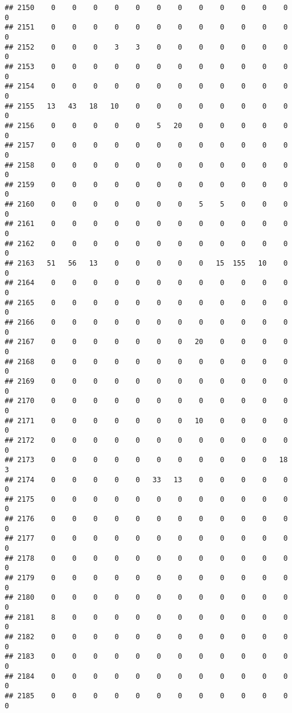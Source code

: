 \documentclass[]{article}
\begin{document}
\begin{verbatim}
## 2150    0    0    0    0    0    0    0    0    0    0    0    0    0
## 2151    0    0    0    0    0    0    0    0    0    0    0    0    0
## 2152    0    0    0    3    3    0    0    0    0    0    0    0    0
## 2153    0    0    0    0    0    0    0    0    0    0    0    0    0
## 2154    0    0    0    0    0    0    0    0    0    0    0    0    0
## 2155   13   43   18   10    0    0    0    0    0    0    0    0    0
## 2156    0    0    0    0    0    5   20    0    0    0    0    0    0
## 2157    0    0    0    0    0    0    0    0    0    0    0    0    0
## 2158    0    0    0    0    0    0    0    0    0    0    0    0    0
## 2159    0    0    0    0    0    0    0    0    0    0    0    0    0
## 2160    0    0    0    0    0    0    0    5    5    0    0    0    0
## 2161    0    0    0    0    0    0    0    0    0    0    0    0    0
## 2162    0    0    0    0    0    0    0    0    0    0    0    0    0
## 2163   51   56   13    0    0    0    0    0   15  155   10    0    0
## 2164    0    0    0    0    0    0    0    0    0    0    0    0    0
## 2165    0    0    0    0    0    0    0    0    0    0    0    0    0
## 2166    0    0    0    0    0    0    0    0    0    0    0    0    0
## 2167    0    0    0    0    0    0    0   20    0    0    0    0    0
## 2168    0    0    0    0    0    0    0    0    0    0    0    0    0
## 2169    0    0    0    0    0    0    0    0    0    0    0    0    0
## 2170    0    0    0    0    0    0    0    0    0    0    0    0    0
## 2171    0    0    0    0    0    0    0   10    0    0    0    0    0
## 2172    0    0    0    0    0    0    0    0    0    0    0    0    0
## 2173    0    0    0    0    0    0    0    0    0    0    0   18    3
## 2174    0    0    0    0    0   33   13    0    0    0    0    0    0
## 2175    0    0    0    0    0    0    0    0    0    0    0    0    0
## 2176    0    0    0    0    0    0    0    0    0    0    0    0    0
## 2177    0    0    0    0    0    0    0    0    0    0    0    0    0
## 2178    0    0    0    0    0    0    0    0    0    0    0    0    0
## 2179    0    0    0    0    0    0    0    0    0    0    0    0    0
## 2180    0    0    0    0    0    0    0    0    0    0    0    0    0
## 2181    8    0    0    0    0    0    0    0    0    0    0    0    0
## 2182    0    0    0    0    0    0    0    0    0    0    0    0    0
## 2183    0    0    0    0    0    0    0    0    0    0    0    0    0
## 2184    0    0    0    0    0    0    0    0    0    0    0    0    0
## 2185    0    0    0    0    0    0    0    0    0    0    0    0    0

\end{verbatim}
\end{document}

